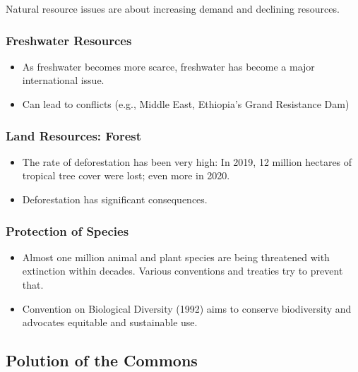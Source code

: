 \documentclass[
]{book}
\begin{document}
Natural resource issues are about increasing demand and declining resources.

\hypertarget{freshwater-resources}{%
\subsubsection{Freshwater Resources}\label{freshwater-resources}}

\begin{itemize}
\item
  As freshwater becomes more scarce, freshwater has become a major international issue.
\item
  Can lead to conflicts (e.g., Middle East, Ethiopia's Grand Resistance Dam)
\end{itemize}

\hypertarget{land-resources-forest}{%
\subsubsection{Land Resources: Forest}\label{land-resources-forest}}

\begin{itemize}
\item
  The rate of deforestation has been very high: In 2019, 12 million hectares of tropical tree cover were lost; even more in 2020.
\item
  Deforestation has significant consequences.
\end{itemize}

\hypertarget{protection-of-species}{%
\subsubsection{Protection of Species}\label{protection-of-species}}

\begin{itemize}
\item
  Almost one million animal and plant species are being threatened with extinction within decades. Various conventions and treaties try to prevent that.
\item
  Convention on Biological Diversity (1992) aims to conserve biodiversity and advocates equitable and sustainable use.
\end{itemize}

\hypertarget{polution-of-the-commons}{%
\subsection{Polution of the Commons}\label{polution-of-the-commons}}
\end{document}
